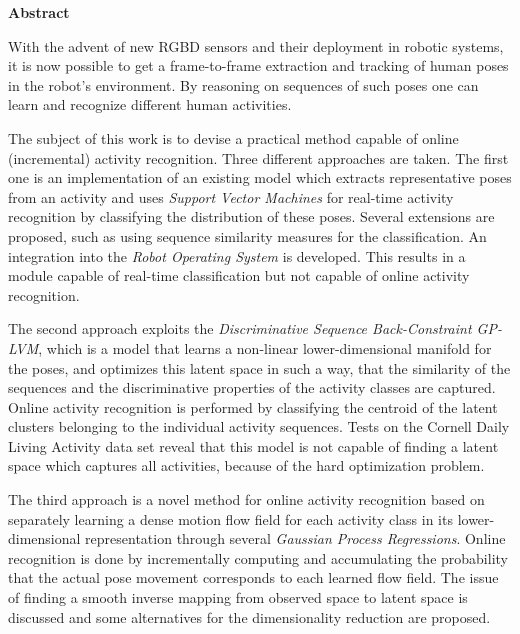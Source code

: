 

\cleardoublepage




\vspace*{2cm}
\begin{center}
{\Large \bf Abstract}
\end{center}
\vspace{1cm}

With the advent of new RGBD sensors and their deployment in robotic systems, it is now possible to get a frame-to-frame extraction and tracking of human poses in the robot's environment. By reasoning on sequences of such poses one can learn and recognize different human activities. 

The subject of this work is to devise a practical method capable of online (incremental) activity recognition. Three different approaches are taken. 
The first one is an implementation of an existing model which extracts representative poses from 
an activity and uses \textit{Support Vector Machines} for real-time activity recognition by classifying the distribution of these poses. Several extensions are proposed, such as using sequence similarity measures for the classification. An integration into the \textit{Robot Operating System} is developed. This results in a module capable of real-time classification but not capable of online activity recognition.

The second approach exploits the \textit{Discriminative Sequence Back-Constraint GP-LVM}, which is a model that learns a non-linear lower-dimensional manifold for the poses, and optimizes this latent space in such a way, that the similarity of the sequences and the discriminative properties of the activity classes are captured. Online activity recognition is performed by classifying the centroid of the latent clusters belonging to the individual activity sequences. Tests on the Cornell Daily Living Activity data set reveal that this model is not capable of finding a latent space which captures all activities, because of the hard optimization problem. 

The third approach is a novel method for online activity recognition based on separately learning a dense motion flow field for each activity class in its lower-dimensional representation through several \textit{Gaussian Process Regressions}. Online recognition is done by incrementally computing and accumulating the probability that the actual pose movement corresponds to each learned flow field. The issue of finding a smooth inverse mapping from observed space to latent space is discussed and some alternatives for the dimensionality reduction are proposed.
